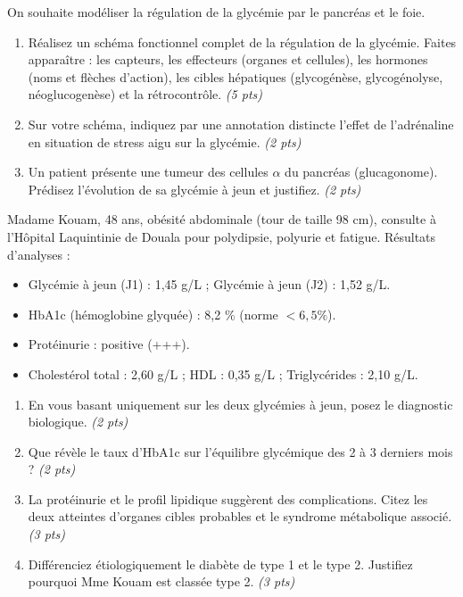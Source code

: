 \documentclass[11pt]{article}
\begin{document}
\begin{exercice}
On souhaite modéliser la régulation de la glycémie par le pancréas et le foie.

\begin{enumerate}
    \item Réalisez un schéma fonctionnel complet de la régulation de la glycémie. Faites apparaître : les capteurs, les effecteurs (organes et cellules), les hormones (noms et flèches d'action), les cibles hépatiques (glycogénèse, glycogénolyse, néoglucogenèse) et la rétrocontrôle. \emph{(5 pts)}
    \item Sur votre schéma, indiquez par une annotation distincte l'effet de l'adrénaline en situation de stress aigu sur la glycémie. \emph{(2 pts)}
    \item Un patient présente une tumeur des cellules $\alpha$ du pancréas (glucagonome). Prédisez l'évolution de sa glycémie à jeun et justifiez. \emph{(2 pts)}
\end{enumerate}
\end{exercice}

\begin{exercice}
Madame Kouam, 48 ans, obésité abdominale (tour de taille 98 cm), consulte à l'Hôpital Laquintinie de Douala pour polydipsie, polyurie et fatigue. Résultats d'analyses :
\begin{itemize}
    \item Glycémie à jeun (J1) : 1,45 g/L ; Glycémie à jeun (J2) : 1,52 g/L.
    \item HbA1c (hémoglobine glyquée) : 8,2 \% (norme $< 6,5 \%$).
    \item Protéinurie : positive (+++).
    \item Cholestérol total : 2,60 g/L ; HDL : 0,35 g/L ; Triglycérides : 2,10 g/L.
\end{itemize}

\begin{enumerate}
    \item En vous basant uniquement sur les deux glycémies à jeun, posez le diagnostic biologique. \emph{(2 pts)}
    \item Que révèle le taux d'HbA1c sur l'équilibre glycémique des 2 à 3 derniers mois ? \emph{(2 pts)}
    \item La protéinurie et le profil lipidique suggèrent des complications. Citez les deux atteintes d'organes cibles probables et le syndrome métabolique associé. \emph{(3 pts)}
    \item Différenciez étiologiquement le diabète de type 1 et le type 2. Justifiez pourquoi Mme Kouam est classée type 2. \emph{(3 pts)}
\end{enumerate}
\end{exercice}
\end{document}
